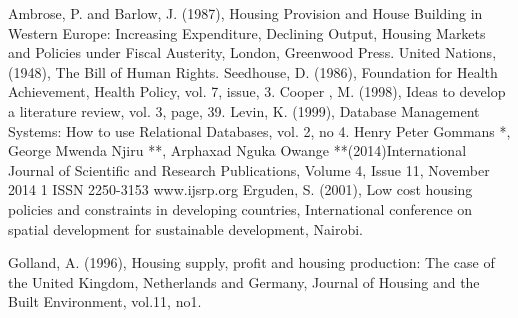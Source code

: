 \documentclass[]{report}
\begin{document}
\begin{thebibliography}{10}
	Ambrose, P. and Barlow, J. (1987), Housing Provision and House Building in Western Europe: Increasing Expenditure, Declining Output, Housing Markets and Policies under Fiscal Austerity, London, Greenwood Press.
	United Nations, (1948), The Bill of Human Rights.
	Seedhouse, D. (1986), Foundation for Health Achievement, Health Policy, vol. 7, issue, 3.
	Cooper , M. (1998), Ideas to develop a literature review, vol. 3, page, 39.
	Levin, K. (1999), Database Management Systems: How to use Relational Databases, vol. 2, no 4.
	Henry Peter Gommans *, George Mwenda Njiru **, Arphaxad Nguka Owange **(2014)International Journal of Scientific and Research Publications, Volume 4, Issue 11, November 2014 1	ISSN 2250-3153 www.ijsrp.org
	Erguden, S. (2001), Low cost housing policies and constraints in developing countries, International conference on spatial development for sustainable development, Nairobi.
	
	Golland, A. (1996), Housing supply, profit and housing production: The case of the United Kingdom, Netherlands and Germany, Journal of Housing and the Built Environment, vol.11, no1.
	
\end{thebibliography}
\appendix
\end{document}
